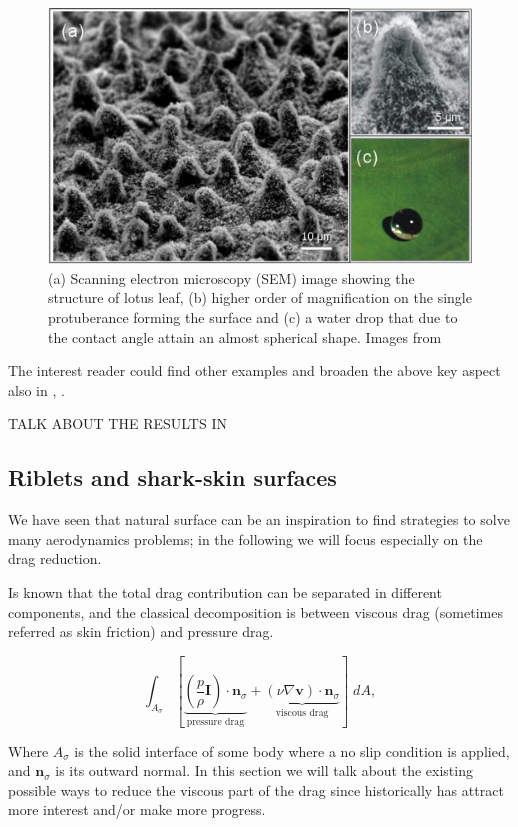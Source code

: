 \begin{figure}[h]
	\centering
	\includegraphics[width=0.6\linewidth]{chapter_1/lotus}
	\caption{(a) Scanning electron microscopy (SEM) image showing the structure of lotus leaf, (b) higher order of magnification on the single protuberance forming the surface and (c) a water drop that due to the contact angle attain an almost spherical shape. Images from \cite{stratakis2009laser}}
	\label{fig:lotus}
\end{figure}


The interest reader could find other examples and broaden the above key aspect also in \cite{bhushan2016biomimetics}, \cite{tropea2012nature}.

TALK ABOUT THE RESULTS IN \citet{segura2017permeable}

\subsection{Riblets and shark-skin surfaces}

We have seen that natural surface can be an inspiration to find strategies to solve many aerodynamics problems; in the following we will focus especially on the drag reduction.

Is known that the total drag contribution can be separated in different components, and the classical decomposition is between viscous drag (sometimes referred as skin friction) and pressure drag.

\begin{equation}
 \int_{A_{\sigma}}  [ \underbrace{\left( \frac{p}{\rho} \mathbf{I} \right) \cdot  \mathbf{n}_{\sigma} }_\text{pressure drag}  +  \underbrace{ \left( \nu \nabla \mathbf{v} \right) \cdot  \mathbf{n}_{\sigma}}_\text{viscous drag} ] \; dA,
 \label{eq:force}
\end{equation}

Where $A_{\sigma}$ is the solid interface of some body where a no slip condition is applied, and $ \mathbf{n}_{\sigma}$ is its outward normal.
In this section we will talk about the existing possible ways to reduce the viscous part of the drag since historically has attract more interest and/or make more progress.

